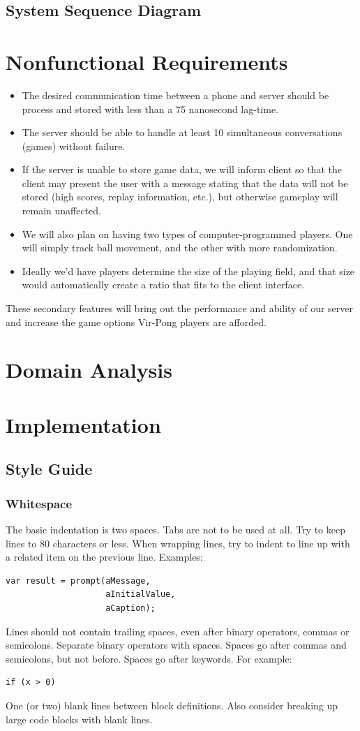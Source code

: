 \documentclass[letterpaper,12pt]{article}
\begin{document}
\subsection{System Sequence Diagram}
\section{Nonfunctional Requirements}
\begin{itemize}
\item The desired communication time between a phone and server should be process and stored with less than a 75 nanosecond lag-time.
\item The server should be able to handle at least 10 simultaneous conversations (games) without failure. 
\item If the server is unable to store game data, we will inform client so that the client may present the user with a message stating that the data will not be stored (high scores, replay information, etc.), but otherwise gameplay will remain unaffected. 
\item We will also plan on having two types of computer-programmed players. One will simply track ball movement, and the other with more randomization. 
\item Ideally we'd have players determine the size of the playing field, and that size would automatically create a ratio that fits to the client interface. 
\end{itemize}
These secondary features will bring out the performance and ability of our server and increase the game options Vir-Pong players are afforded. 
\section{Domain Analysis}
\section{Implementation}
\subsection{Style Guide}
\subsubsection{Whitespace}
The basic indentation is two spaces. Tabs are not to be used at all.
Try to keep lines to 80 characters or less. When wrapping lines, try to indent to line up with a related item on the previous line. Examples: 
\begin{verbatim}
var result = prompt(aMessage,
                    aInitialValue,
                    aCaption);
\end{verbatim}
Lines should not contain trailing spaces, even after binary operators, commas or semicolons.
Separate binary operators with spaces.
Spaces go after commas and semicolons, but not before.
Spaces go after keywords. For example:
\begin{verbatim}
if (x > 0)
\end{verbatim}
One (or two) blank lines between block definitions. Also consider breaking up large code blocks with blank lines.
\end{document}
